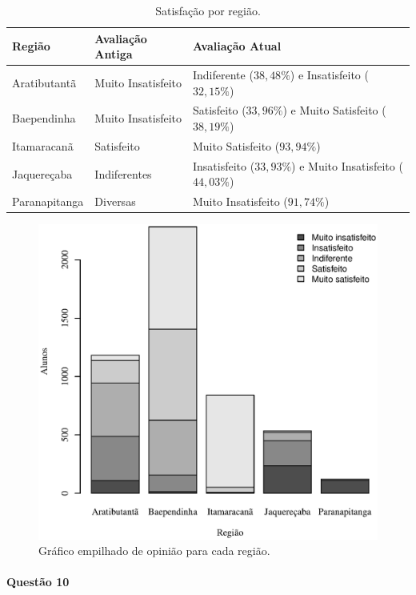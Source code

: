 \documentclass[10pt,a4paper,oneside]{article}
\newcommand{\arat}{Aratibutantã\xspace}
\newcommand{\baep}{Baependinha\xspace}
\newcommand{\itam}{Itamaracanã\xspace}
\newcommand{\jaqu}{Jaquereçaba\xspace}
\newcommand{\para}{Paranapitanga\xspace}
\begin{document}
\begin{table}[!h]
	\centering
	\caption{Satisfação por região.}
	\vspace{0.5em}
	\label{table:satisfacao-regiao}
	\begin{tabular}{l l l}
		\toprule
		\textbf{Região} & \textbf{Avaliação Antiga} & \textbf{Avaliação Atual}                \\
		\midrule
		\arat  & Muito Insatisfeito & Indiferente ($38,48\%$) e Insatisfeito ($32,15\%$)      \\
		\baep  & Muito Insatisfeito & Satisfeito ($33,96\%$) e Muito Satisfeito ($38,19\%$)   \\
		\itam  & Satisfeito         & Muito Satisfeito ($93,94\%$)                            \\
		\jaqu  & Indiferentes       & Insatisfeito ($33,93\%$) e Muito Insatisfeito ($44,03\%$) \\
		\para  & Diversas           & Muito Insatisfeito ($91,74\%$)                          \\
		\bottomrule
	\end{tabular}
\end{table}

\begin{figure}[!h]
	\centering
	\includegraphics[width=.75\linewidth]{plots/stacked_opiniao_por_regiao.eps}
	\caption{Gráfico empilhado de opinião para cada região.}
	\label{fig:stacked-opiniao-por-regiao}
\end{figure}

\FloatBarrier
\paragraph{Questão 10}
\end{document}

